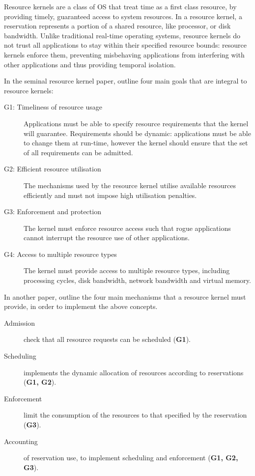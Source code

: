 Resource kernels are a class of \gls{OS} that treat time as a first class resource, by providing
timely, guaranteed access to system resources.  In a resource kernel, a reservation represents a
portion of a shared resource, like processor, or disk bandwidth.  Unlike traditional real-time
operating systems, resource kernels do not trust all applications to stay within their specified
resource bounds: resource kernels enforce them, preventing misbehaving applications from interfering
with other applications and thus providing temporal isolation.

In the seminal resource kernel paper, \citet{Rajkumar_JMO_98} outline four main goals that are
integral to resource kernels:
\begin{description}
    \item[G1: Timeliness of resource usage] Applications must be able to specify resource
        requirements that the kernel will guarantee.  Requirements should be dynamic: applications
        must be able to change them at run-time, however the kernel should ensure that the set of
        all requirements can be admitted.
    \item[G2: Efficient resource utilisation] The mechanisms used by the resource kernel utilise
        available resources efficiently and must not impose high utilisation penalties.
    \item[G3: Enforcement and protection] The kernel must enforce resource access such that rogue
        applications cannot interrupt the resource use of other applications.
    \item[G4: Access to multiple resource types] The kernel must provide access to multiple resource
        types, including processing cycles, disk bandwidth, network bandwidth and virtual memory.
\end{description}

In another paper, \citet{deNiz_LSR_01} outline the four main mechanisms that a resource kernel must
provide, in order to implement the above concepts.

\begin{description}
	\item[Admission] check that all resource requests can be scheduled (\textbf{G1}).
	\item[Scheduling] implements the dynamic allocation of resources according to reservations (\textbf{G1, G2}).
	\item[Enforcement] limit the consumption of the resources to that specified by the
        reservation (\textbf{G3}).
	\item[Accounting] of reservation use, to implement scheduling and enforcement (\textbf{G1, G2, G3}).
\end{description}

